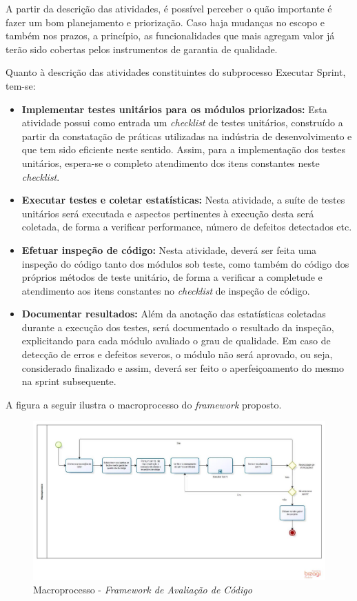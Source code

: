 A partir da descrição das atividades, é possível perceber o quão importante é fazer um bom planejamento e priorização. Caso haja mudanças no escopo e também nos prazos, a princípio, as funcionalidades que mais agregam valor já terão sido cobertas pelos instrumentos de garantia de qualidade.

Quanto à descrição das atividades constituintes do subprocesso Executar Sprint, tem-se:

\begin{itemize}
	\item \textbf{Implementar testes unitários para os módulos priorizados:} Esta atividade possui como entrada um \textit{checklist} de testes unitários, construído a partir da constatação de práticas utilizadas na indústria de desenvolvimento e que tem sido eficiente neste sentido. Assim, para a implementação dos testes unitários, espera-se o completo atendimento dos itens constantes neste \textit{checklist}.

	\item \textbf{Executar testes e coletar estatísticas:} Nesta atividade, a suíte de testes unitários será executada e aspectos pertinentes à execução desta será coletada, de forma a verificar performance, número de defeitos detectados etc.

	\item \textbf{Efetuar inspeção de código:} Nesta atividade, deverá ser feita uma inspeção do código tanto dos módulos sob teste, como também do código dos próprios métodos de teste unitário, de forma a verificar a completude e atendimento aos itens constantes no \textit{checklist} de inspeção de código.

	\item \textbf{Documentar resultados:} Além da anotação das estatísticas coletadas durante a execução dos testes, será documentado o resultado da inspeção, explicitando para cada módulo avaliado o grau de qualidade. Em caso de detecção de erros e defeitos severos, o módulo não será aprovado, ou seja, considerado finalizado e assim, deverá ser feito o aperfeiçoamento do mesmo na sprint subsequente.
\end{itemize}

A figura a seguir ilustra o macroprocesso do \textit{framework} proposto.

\begin{figure}[h]
\includegraphics[width=\textwidth]{figuras/macroprocesso.jpg}
\caption{Macroprocesso - \textit{Framework de Avaliação de Código}}
\end{figure}


